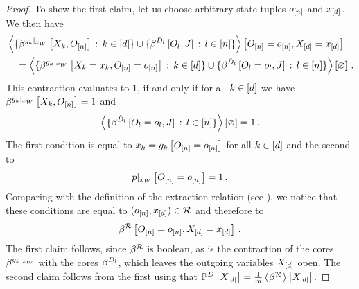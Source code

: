 \begin{proof}
    To show the first claim, let us choose arbitrary state tuples $o_{[n]}$ and $x_{[d]}$.
    We then have
    \begin{align*}
        &\left\langle 
            \{\beta^{{g_{k}}|_{x_{W}}}\left[X_{k},O_{[n]}\right] \,:\, k\in[d]\}
            \cup \{\beta^{\tilde{D}_{l}}\left[O_{l},J\right] \,:\, l\in[n]\}
        \right\rangle \left[ O_{[n]}=o_{[n]},X_{[d]}=x_{[d]} \right] \\
        & \quad  =  \left\langle 
            \{\beta^{{g_{k}}|_{x_{W}}}\left[X_{k}=x_{k},O_{[n]}=o_{[n]}\right] \,:\, k\in[d]\}
            \cup \{\beta^{\tilde{D}_{l}}\left[O_{l}=o_{l},J\right] \,:\, l\in[n]\}
        \right\rangle \left[ \varnothing \right] \, .
    \end{align*}
    This contraction evaluates to $1$, if and only if for all $k\in[d]$ we have $\beta^{{g_{k}}|_{x_{W}}}\left[X_{k},O_{[n]}\right]=1$ and
    \begin{align*}
        \left\langle \{\beta^{\tilde{D}_{l}}\left[O_{l}=o_{l},J\right] \,:\, l\in[n]\}\right\rangle \left[ \varnothing \right]  = 1 \, .
    \end{align*}
    The first condition is equal to $x_{k} = g_{k}\left[O_{[n]}=o_{[n]}\right]$ for all $k\in[d]$ and the second to
    \begin{align*}
        {p}|_{x_{W}} \left[O_{[n]}=o_{[n]}\right] = 1 \, .
    \end{align*}
    Comparing with the definition of the extraction relation (see ), we notice that these conditions are equal to $(o_{[n]},x_{[d]})\in\mathcal{R}$ and therefore to
    \begin{align*}
        \beta^{\mathcal{R}}\left[O_{[n]}=o_{[n]},X_{[d]}=x_{[d]}\right] \, .
    \end{align*}
    The first claim follows, since $\beta^{\mathcal{R}}$ is boolean, as is the contraction of the cores $\beta^{{g_{k}}|_{x_{W}}}$ with the cores $\beta^{\tilde{D}_{l}}$, which leaves the outgoing variables $X_{[d]}$ open.
    The second claim follows from the first using that $\mathbb{P}^{D}\left[X_{[d]}\right]=\frac{1}{m}\left\langle \beta^{\mathcal{R}}\right\rangle \left[ X_{[d]} \right]$.
\end{proof}

